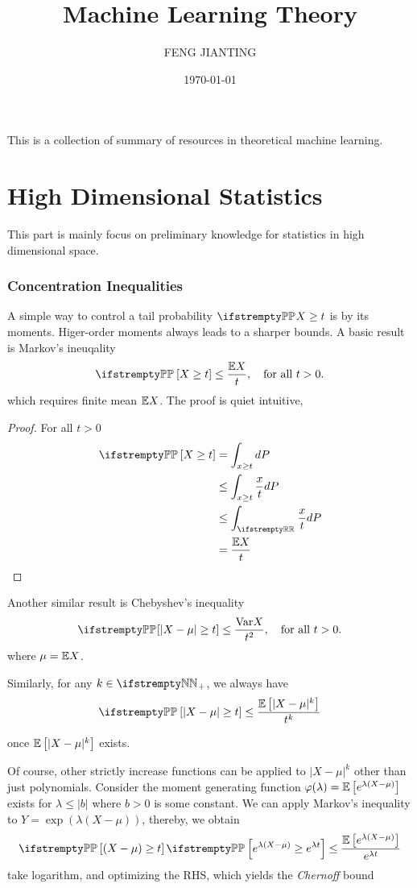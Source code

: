 \documentclass{paper}
\title{Machine Learning Theory}
\author{FENG JIANTING}
\date{\today}
\begin{document}
\maketitle
This is a collection of summary of resources in theoretical machine learning.
\tableofcontents
\part{High Dimensional Statistics}
This part is mainly focus on preliminary knowledge for statistics in high dimensional space.
\section{Concentration Inequalities}
A simple way to control a tail probability $\PP{X}\geq t$ is by its moments. Higer-order moments always leads to a sharper bounds. A basic result is Markov's ineuqality
\[
	\PP \left[X\geq t\right] \leq \frac{\EE X}{t}, \quad \text{for all } t > 0.
\]
which requires finite mean $\mathbb{E}{X}$. The proof is quiet intuitive,
\begin{proof}
	For all $t > 0$
	\begin{align}
		\PP\left[X\geq t\right] & = \int_{x\geq t} dP               \\
		                        & \leq \int_{x\geq t} \frac{x}{t}dP \\
		                        & \leq\int_{\RR}\frac{x}{t}dP       \\
		                        & = \frac{\EE X}{t}
	\end{align}
\end{proof}

Another similar result is Chebyshev's inequality
\[
	\PP{\left[\vert X-\mu\vert \geq t\right]} \leq \frac{\var{X}}{t^2}, \quad \text{for all } t > 0.
\]
where $\mu=\mathbb{E} X$.

Similarly, for any $k\in \NN_+$, we always have
\[
	\PP\left[\vert X-\mu\vert\geq t\right] \leq \frac{\EE\left[\vert X-\mu\vert^k\right]}{t^k}
\]

once $\mathbb{E}\left[\vert X-\mu\vert^k\right]$ exists.

Of course, other strictly increase functions can be applied to $\vert X-\mu\vert ^k$ other than just polynomials.
Consider the moment generating function $\varphi(\lambda) = \mathbb{E} \left[e^{\lambda(X-\mu)}\right]$ exists for $\lambda \leq \vert b\vert$ where $b>0$ is some constant.
We can apply Markov's inequality to $Y = \exp(\lambda (X-\mu))$, thereby, we obtain
\[
	\PP\left[(X-\mu)\geq t\right] \PP\left[e^{\lambda(X-\mu)}\geq e^{\lambda t}\right] \leq \frac{\EE\left[e^{\lambda(X-\mu)}\right]}{e^{\lambda t}}
\]
take logarithm, and optimizing the RHS, which yields the \textit{Chernoff} bound
\end{document}
